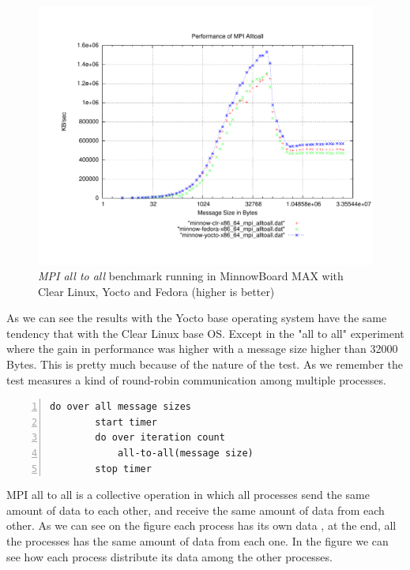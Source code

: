 \begin{figure}[H]
\centering
\includegraphics[width=1 \textwidth]{images/mpbench_yocto_experiments/mpi_alltoall.pdf}
\caption{\textit{MPI all to all} benchmark running in  MinnowBoard MAX with Clear Linux, Yocto
and Fedora (higher is better)}
\label{mpi_all_to_all_yocto}
\end{figure}

As we can see the results with the Yocto base operating system have the same
tendency that with the Clear Linux base OS. Except in the "all to all"
experiment where the gain in performance was higher with a message size higher
than 32000 Bytes. This is pretty much because of the nature of the test. As we
remember the test measures a kind of round-robin communication among multiple
processes.

\begin{minipage}{\textwidth}
\end{minipage}

\begin{minipage}{\textwidth}
\begin{lstlisting}[frame=single,numbers=left]
    do over all message sizes 
        start timer
        do over iteration count 
            all-to-all(message size)
        stop timer
\end{lstlisting}

\end{minipage}

MPI all to all  is a collective operation in which all processes send the same
amount of data to each other, and receive the same amount of data from each
other. As we can see on the figure each process has its own data , at the end,
all the processes has the same amount of data from each one. In the figure we
can see how each process distribute its data among the other processes.

